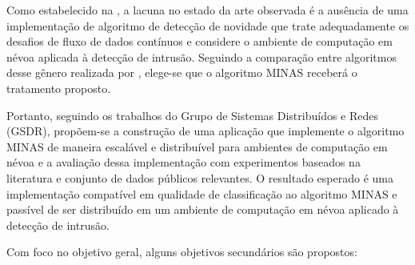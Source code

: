 Como estabelecido na , a lacuna no estado da arte observada é
a ausência de uma implementação de algoritmo de detecção de
novidade que trate adequadamente os desafios de fluxo de dados contínuos e
considere o ambiente de computação em névoa aplicada à detecção de
intrusão.
Seguindo a comparação entre algoritmos desse gênero realizada por
, elege-se que o algoritmo MINAS \cite{Faria2016minas}
receberá o tratamento proposto.

Portanto, seguindo os trabalhos do Grupo de Sistemas Distribuídos e Redes
(GSDR), propõem-se a construção de uma aplicação que implemente o algoritmo MINAS
de maneira escalável e distribuível para ambientes de computação em névoa e a avaliação
dessa implementação com experimentos baseados na literatura e conjunto de dados
públicos relevantes.
O resultado esperado é uma implementação compatível em qualidade de
classificação ao algoritmo MINAS e passível de ser distribuído em um ambiente
de computação em névoa aplicado à detecção de intrusão.



% 

Com foco no objetivo geral, alguns objetivos secundários são propostos:




